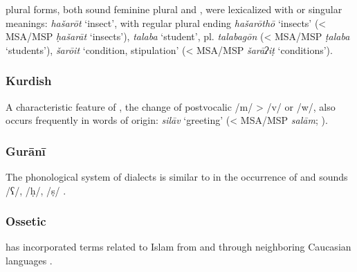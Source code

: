 \documentclass[output=paper]{langsci/langscibook}
\begin{document}
 plural forms, both sound feminine plural and , were lexicalized with  or singular meanings: \textit{hašarōt} ‘insect’, with regular plural ending \textit{hašarōthō} ‘insects’ (< MSA/MSP \textit{ḥašarāt} ‘insects’), \textit{talaba} ‘student’, pl. \textit{talabagōn} (< MSA/MSP \textit{ṭalaba} ‘students’), \textit{šarōit} ‘condition, stipulation’ (< MSA/MSP \textit{šarāʔiṭ} ‘conditions’).


\subsubsection{Kurdish}

A characteristic feature of , the change of postvocalic /m/ > /v/ or /w/, also occurs frequently in words of  origin: \textit{silāv} ‘greeting’ (< MSA/MSP \textit{salām}; \citealt{Paul2008}).

\subsubsection{Gurānī}

The phonological system of  dialects is similar to  in the occurrence of   and  sounds /ʕ/, /ḥ/, /ṣ/ \citep{MacKenzie2012}.

\subsubsection{Ossetic}
 has incorporated terms related to Islam from  and  through neighboring Caucasian languages \citep{Thordarson2009}.
\end{document}
